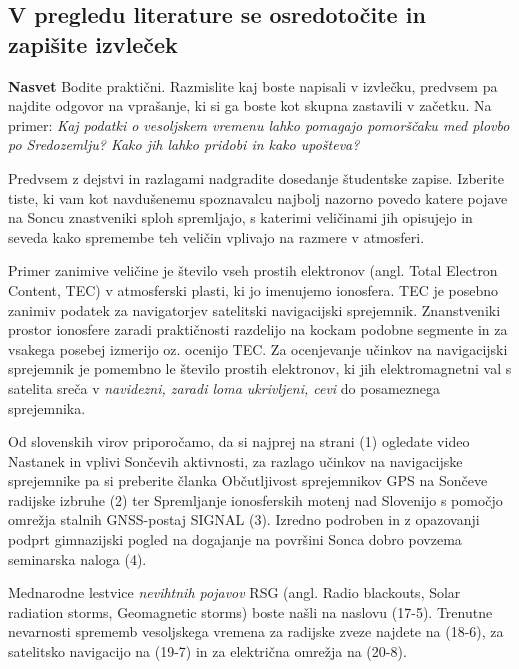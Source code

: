 \subsection{V pregledu literature se osredotočite in zapišite izvleček}
\label{subsec:VesVrem_ZapIzvlLit}

\textbf{Nasvet} Bodite praktični. Razmislite kaj boste napisali v izvlečku, predvsem pa najdite odgovor na vprašanje, ki si ga boste kot skupna zastavili v začetku. Na primer: \textit{Kaj podatki o vesoljskem vremenu lahko pomagajo pomorščaku med plovbo po Sredozemlju? Kako jih lahko pridobi in kako upošteva?}

Predvsem z dejstvi in razlagami nadgradite dosedanje študentske zapise. Izberite tiste, ki vam kot navdušenemu spoznavalcu najbolj nazorno povedo katere pojave na Soncu znastveniki sploh spremljajo, s katerimi veličinami jih opisujejo in seveda kako spremembe teh veličin vplivajo na razmere v atmosferi.

Primer zanimive veličine je število vseh prostih elektronov (angl. Total Electron Content, TEC) v atmosferski plasti, ki jo imenujemo ionosfera. TEC je posebno zanimiv podatek za navigatorjev satelitski navigacijski sprejemnik. Znanstveniki prostor ionosfere zaradi praktičnosti razdelijo na kockam podobne segmente in za vsakega posebej izmerijo oz. ocenijo TEC. Za ocenjevanje učinkov na navigacijski sprejemnik je pomembno le število prostih elektronov, ki jih elektromagnetni val s satelita sreča v \textit{navidezni, zaradi loma ukrivljeni, cevi} do posameznega sprejemnika.
   
Od slovenskih virov priporočamo, da si najprej na strani (1) ogledate video Nastanek in vplivi Sončevih aktivnosti, za razlago učinkov na navigacijske sprejemnike pa si preberite članka Občutljivost sprejemnikov GPS na Sončeve radijske izbruhe (2) ter Spremljanje ionosferskih motenj nad Slovenijo s pomočjo omrežja stalnih GNSS-postaj SIGNAL (3). Izredno podroben in z opazovanji podprt gimnazijski pogled na dogajanje na površini Sonca dobro povzema seminarska naloga (4).

Mednarodne lestvice \textit{nevihtnih pojavov} RSG (angl. Radio blackouts, Solar radiation storms, Geomagnetic storms) boste našli na naslovu (17-5). Trenutne nevarnosti sprememb vesoljskega vremena za radijske zveze najdete na (18-6), za satelitsko navigacijo na (19-7) in za električna omrežja na (20-8).


